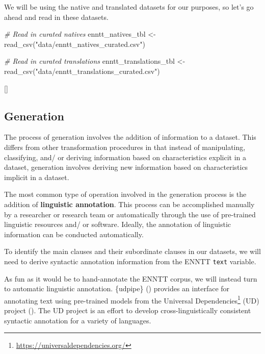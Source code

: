 \documentclass[
  letterpaper,
  krantz1]{latex/krantz-mod}
\newenvironment{Shaded}{\begin{snugshade}}{\end{snugshade}}
\newcommand{\CommentTok}[1]{\textcolor[rgb]{0.00,0.00,0.00}{\textit{#1}}}
\newcommand{\FunctionTok}[1]{\textcolor[rgb]{0.00,0.00,0.00}{#1}}
\newcommand{\NormalTok}[1]{\textcolor[rgb]{0.00,0.00,0.00}{#1}}
\newcommand{\OtherTok}[1]{\textcolor[rgb]{0.00,0.00,0.00}{#1}}
\newcommand{\StringTok}[1]{\textcolor[rgb]{0.00,0.00,0.00}{#1}}
\newcommand{\cindex}[1]{%
  \StrSubstitute{#1}{_}{\_}[\temp]%
  \index{\temp}%
}
\theoremstyle{definition}
\theoremstyle{definition}
\theoremstyle{remark}
\DeclareRobustCommand{\href}[2]{#2\footnote{\url{#1}}}
\begin{document}
We will be using the native and translated datasets for our purposes, so
let's go ahead and read in these datasets.

\begin{Shaded}
\begin{Highlighting}[numbers=left,,]
\CommentTok{\# Read in curated natives}
\NormalTok{enntt\_natives\_tbl }\OtherTok{\textless{}{-}}
  \FunctionTok{read\_csv}\NormalTok{(}\StringTok{"data/enntt\_natives\_curated.csv"}\NormalTok{)}

\CommentTok{\# Read in curated translations}
\NormalTok{enntt\_translations\_tbl }\OtherTok{\textless{}{-}}
  \FunctionTok{read\_csv}\NormalTok{(}\StringTok{"data/enntt\_translations\_curated.csv"}\NormalTok{)}
\end{Highlighting}
\end{Shaded}

 \cindex{read_csv()}

\subsection{Generation}\label{sec-transform-generation}

The process of generation involves the addition of information to a
dataset. This differs from other
transformation procedures in that instead of manipulating, classifying,
and/ or deriving information based on characteristics explicit in a
dataset, generation involves deriving new information based on
characteristics implicit in a dataset.

The most common type of operation involved in the generation process is
the addition of \textbf{linguistic
annotation}. This process can be
accomplished manually by a researcher or research team or automatically
through the use of pre-trained linguistic resources and/ or software.
Ideally, the annotation of linguistic information can be conducted
automatically.

To identify the main clauses and their subordinate clauses in our
datasets, we will need to derive syntactic annotation information from
the ENNTT \texttt{text} variable.

As fun as it would be to hand-annotate the ENNTT corpus, we will instead
turn to automatic linguistic annotation. \{udpipe\}
() provides an interface for
annotating text using pre-trained models from the
\href{https://universaldependencies.org/}{Universal Dependencies} (UD)
project (). The UD project
is an effort to develop cross-linguistically consistent syntactic
annotation for a variety of
languages.
\end{document}
